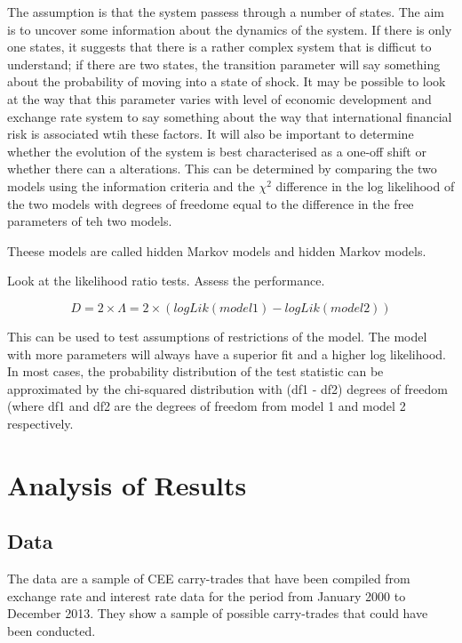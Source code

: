 \documentclass[12pt, a4paper, oneside]{article} %
\begin{document}
The assumption is that the system passess through a number of states.  The aim is to uncover some information about the dynamics of the system.  If there is only one states,  it suggests that there is a rather complex system that is difficut to understand; if there are two states, the transition parameter will say something about the probability of moving into a state of shock.  It may be possible to look at the way that this parameter varies with level of economic development and exchange rate system to say something about the way that international financial risk is associated wtih these factors.  It will also be important to determine whether the evolution of the system is best characterised as a one-off shift or whether there can a alterations.  This can be determined by comparing the two models using the information criteria and the $\chi^2$ difference in the log likelihood of the two models with degrees of freedome equal to the difference in the free parameters of teh two models. 

Theese models are called hidden Markov models and hidden Markov models.

Look at the likelihood ratio tests.  Assess the performance. 

\begin{equation}
D = 2 \times \Lambda = 2 \times (logLik(model 1) - logLik(model 2))
\end{equation}

This can be used to test assumptions of restrictions of the model. The model with more parameters will always have a superior fit and a higher log likelihood.  In most cases, the probability distribution of the test statistic can be approximated by the chi-squared distribution with (df1 - df2) degrees of freedom (where df1 and df2 are the degrees of freedom from model 1 and model 2 respectively.





\section{Analysis of Results}
\subsection{Data}
The data are a sample of CEE carry-trades that have been compiled from exchange rate and interest rate data for the period from January 2000 to December 2013.  They show a sample of possible carry-trades that could have been conducted. 
\end{document}
